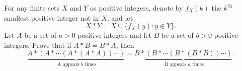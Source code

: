 For any finite sets 
$X$
 and 
$Y$
 os positive integers, denote by 
$f_X(k)$
 the 
$k^{\text{th}}$
 smallest positive integer not in 
$X$,
 and let 
$$X*Y=X\cup \{ f_X(y):y\in Y\}.$$
Let  
$A$
 be a set of 
$a >0$
 positive integers and let 
$B$
 be a set of 
$b >0$
 positive integers. Prove that if 
$A*B=B*A$,
 then 
$$\underbrace{A*(A*\cdots (A*(A*A))\cdots )}_{\text{ A appears $b$ times}}=\underbrace{B*(B*\cdots (B*(B*B))\cdots )}_{\text{ B appears $a$ times}}.$$
